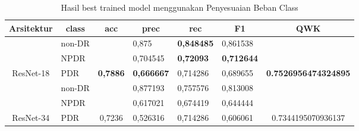 \begin{table}[hbtp]
	\begin{center}
		\caption{Hasil best trained model menggunakan Penyesuaian Beban Class}
		\label{tb:HasilTrainClassWeight}
		\begin{tabular}{|c|l|c|l|l|l|c|}
			\hline
			\rowcolor[HTML]{C0C0C0} 
			Arsitektur & \multicolumn{1}{c|}{\cellcolor[HTML]{C0C0C0}class} & acc                      & \multicolumn{1}{c|}{\cellcolor[HTML]{C0C0C0}prec} & \multicolumn{1}{c|}{\cellcolor[HTML]{C0C0C0}rec} & \multicolumn{1}{c|}{\cellcolor[HTML]{C0C0C0}F1} & QWK                                  \\ \hline
			& non-DR                                             &                          & 0,875                                             & \textbf{0,848485}                                & 0,861538                                        &                                      \\ \cline{2-2} \cline{4-6}
			& NPDR                                               &                          & 0,704545                                          & \textbf{0,72093}                                 & \textbf{0,712644}                               &                                      \\ \cline{2-2} \cline{4-6}
			\multirow{-3}{*}{ResNet-18}  & PDR                                                & \multirow{-3}{*}{\textbf{0,7886}} & \textbf{0,666667}                        & 0,714286                                         & 0,689655                                        & \multirow{-3}{*}{\textbf{0.7526956474324895}} \\ \hline
			& non-DR                                             &                          & 0,877193                                          & 0,757576                                         & 0,813008                                        &                                      \\ \cline{2-2} \cline{4-6}
			& NPDR                                               &                          & 0,617021                                          & 0,674419                                         & 0,644444                                        &                                      \\ \cline{2-2} \cline{4-6}
			\multirow{-3}{*}{ResNet-34}  & PDR                                                & \multirow{-3}{*}{0,7236} & 0,526316                                          & 0,714286                                         & 0,606061                                        & \multirow{-3}{*}{0.7344195070936137} \\ \hline

\end{tabular}
\end{center}
\end{table}
